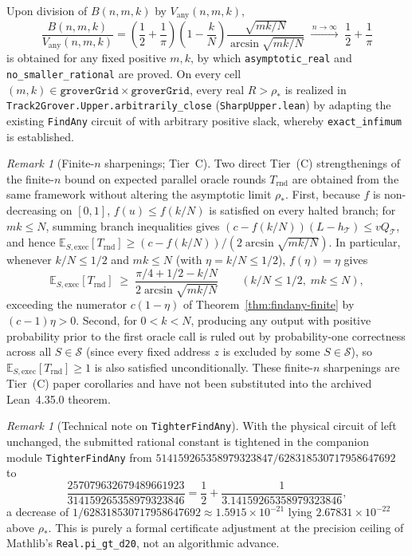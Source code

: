\documentclass[11pt,a4paper]{article}
\theoremstyle{definition}
\theoremstyle{remark}
\newtheorem{remark}[theorem]{Remark}
\begin{document}
Upon division of \(B(n,m,k)\) by \(V_{\mathrm{any}}(n,m,k)\),
\[
  \frac{B(n,m,k)}{V_{\mathrm{any}}(n,m,k)}
  = \left(\frac{1}{2} + \frac{1}{\pi}\right)\left(1 - \frac{k}{N}\right)
    \frac{\sqrt{mk/N}}{\arcsin\sqrt{mk/N}}
  \;\xrightarrow{\,n \to \infty\,}\; \frac{1}{2} + \frac{1}{\pi}
\]
is obtained for any fixed positive \(m, k\), by which \texttt{asymptotic\_\allowbreak real} and \texttt{no\_\allowbreak smaller\_\allowbreak rational} are proved. On every cell \((m,k) \in \texttt{groverGrid} \times \texttt{groverGrid}\), every real \(R > \rho_*\) is realized in \texttt{Track2Grover.\allowbreak Upper.\allowbreak arbitrarily\_\allowbreak close} (\texttt{SharpUpper.lean}) by adapting the existing \texttt{FindAny} circuit of \cite{shirobokov2026} with arbitrary positive slack, whereby \texttt{exact\_infimum} is established.

\begin{remark}[Finite-\(n\) sharpenings; Tier~C]
\label{rem:finite-sharp}
Two direct Tier~(C) strengthenings of the finite-\(n\) bound on expected parallel oracle rounds \(T_{\mathrm{rnd}}\) are obtained from the same framework without altering the asymptotic limit \(\rho_*\). First, because \(f\) is non-decreasing on \([0,1]\), \(f(u) \le f(k/N)\) is satisfied on every halted branch; for \(mk \le N\), summing branch inequalities gives \((c - f(k/N))(L - h_{\mathcal{T}}) \le v Q_{\mathcal{T}}\), and hence \(\mathbb{E}_{S,\mathrm{exec}}[T_{\mathrm{rnd}}] \ge (c - f(k/N))/(2\arcsin\sqrt{mk/N})\). In particular, whenever \(k/N \le 1/2\) and \(mk \le N\) (with \(\eta = k/N \le 1/2\)), \(f(\eta) = \eta\) gives
\[
  \mathbb{E}_{S,\mathrm{exec}}[T_{\mathrm{rnd}}] \;\ge\; \frac{\pi/4 + 1/2 - k/N}{2\arcsin\sqrt{mk/N}}
  \qquad (k/N \le 1/2,\; mk \le N),
\]
exceeding the numerator \(c(1-\eta)\) of Theorem~\ref{thm:findany-finite} by \((c - 1)\eta > 0\). Second, for \(0 < k < N\), producing any output with positive probability prior to the first oracle call is ruled out by probability-one correctness across all \(S \in \mathcal{S}\) (since every fixed address \(z\) is excluded by some \(S \in \mathcal{S}\)), so \(\mathbb{E}_{S,\mathrm{exec}}[T_{\mathrm{rnd}}] \ge 1\) is also satisfied unconditionally. These finite-\(n\) sharpenings are Tier~(C) paper corollaries and have not been substituted into the archived Lean~4.35.0 theorem.
\end{remark}

\begin{remark}[Technical note on \texttt{Tighter\allowbreak FindAny}]
With the physical circuit of \cite{shirobokov2026} left unchanged, the submitted rational constant is tightened in the companion module \texttt{Tighter\allowbreak FindAny} from \(514159265358979323847/628318530717958647692\) to
\[
  \frac{257079632679489661923}{314159265358979323846}
  = \frac{1}{2} + \frac{1}{3.14159265358979323846},
\]
a decrease of \(1/628318530717958647692 \approx 1.5915 \times 10^{-21}\) lying \(2.67831 \times 10^{-22}\) above \(\rho_*\). This is purely a formal certificate adjustment at the precision ceiling of Mathlib's \texttt{Real.pi\_gt\_d20}, not an algorithmic advance.
\end{remark}
\end{document}
